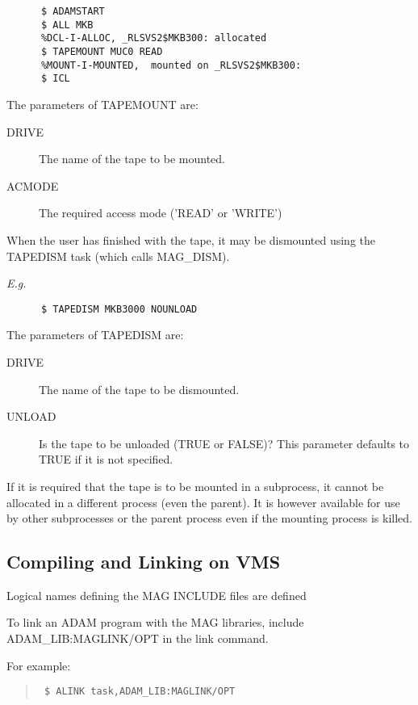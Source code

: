 \small
\begin{verbatim}
      $ ADAMSTART
      $ ALL MKB
      %DCL-I-ALLOC, _RLSVS2$MKB300: allocated
      $ TAPEMOUNT MUC0 READ
      %MOUNT-I-MOUNTED,  mounted on _RLSVS2$MKB300:
      $ ICL
\end{verbatim}
\normalsize

The parameters of TAPEMOUNT are:
\begin{description}
\item[DRIVE] \hspace{5mm} The name of the tape to be mounted.
\item[ACMODE] \hspace{5mm} The required access mode ('READ' or 'WRITE')
\end{description}

When the user has finished with the tape, it may be dismounted using the
TAPEDISM task (which calls MAG\_DISM).

{\em E.g.}
\small
\begin{verbatim}
      $ TAPEDISM MKB3000 NOUNLOAD
\end{verbatim}
\normalsize

The parameters of TAPEDISM are:
\begin{description}
\item[DRIVE] \hspace{5mm} The name of the tape to be dismounted.
\item[UNLOAD] Is the tape to be unloaded (TRUE or FALSE)? This parameter
defaults to TRUE if it is not specified.
\end{description}

If it is required that the tape is to be mounted in a subprocess, it
cannot be allocated in a different process (even the parent). It is
however available for use by other subprocesses or the parent process
even if the mounting process is killed.

\subsection{Compiling and Linking on VMS}

Logical names defining the MAG INCLUDE files are defined

To link an ADAM program with the MAG libraries, include ADAM\_LIB:MAGLINK/OPT
in the link command.

For example:

\begin{quote}{\tt
\$ ALINK task,ADAM\_LIB:MAGLINK/OPT
}
\end{quote}

